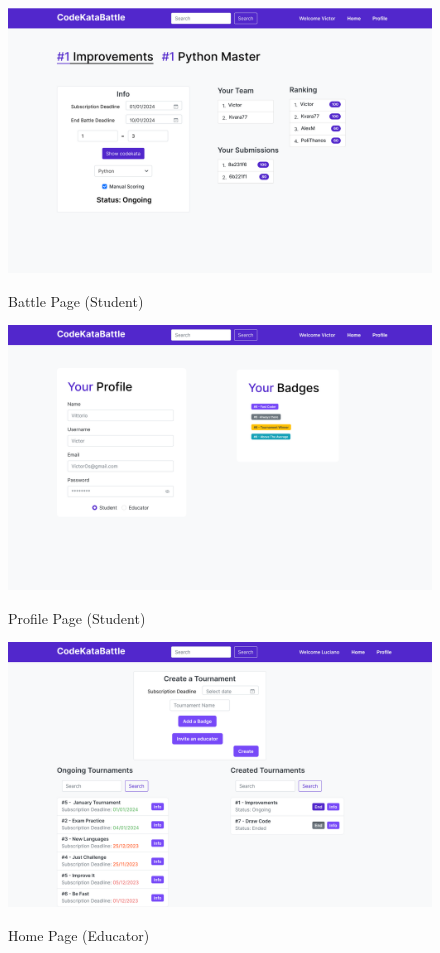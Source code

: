 \documentclass{Configuration_Files/Template}
\begin{document}
\begin{figure}[H]
\centering
\includegraphics[scale = 0.25]{DD_latex/Images/UI/BattlePage_Student.png}\\
\caption{Battle Page (Student)}
\end{figure}

\begin{figure}[H]
\centering
\includegraphics[scale = 0.25]{DD_latex/Images/UI/Profile_Student.png}\\
\caption{Profile Page (Student) }
\end{figure}

\begin{figure}[H]
\centering
\includegraphics[scale = 0.25]{DD_latex/Images/UI/MainPageEducator.png}\\
\caption{Home Page (Educator)}
\end{figure}
\end{document}
